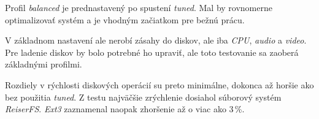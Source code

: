 Profil \emph{balanced} je prednastavený po spustení \emph{tuned}. Mal by
rovnomerne optimalizovať systém a je vhodným začiatkom pre bežnú prácu.

V základnom nastavení ale nerobí zásahy do diskov, ale iba \emph{CPU},
\emph{audio} a \emph{video}. Pre ladenie diskov by bolo potrebné ho upraviť,
ale toto testovanie sa zaoberá základnými profilmi.

Rozdiely v rýchlosti diskových operácií su preto minimálne, dokonca až horšie
ako bez použitia \emph{tuned}. Z testu najväčšie zrýchlenie dosiahol súborový
systém \emph{ReiserFS}. \emph{Ext3} zaznamenal naopak zhoršenie až o viac ako
3\,\%.

